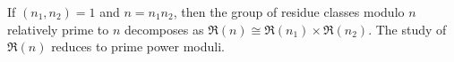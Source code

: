If $(n_1,n_2) = 1$ and $n = n_1n_2$, then the group of residue classes modulo $n$ relatively prime to $n$ decomposes as $\Re(n) \cong \Re(n_1) \times \Re(n_2)$. The study of $\Re(n)$ reduces to prime power moduli.
